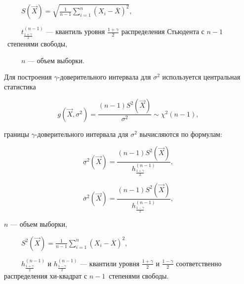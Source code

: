 \noindent~~~~~$S(\vec X) = \sqrt{\frac{1}{n-1} \sum\limits_{i=1}^{n} (X_i -
\overline X)^2}$,

\noindent~~~~~$t_{\frac{1+\gamma}{2}}^{(n-1)}$ --- квантиль уровня $\frac{1+\gamma}{2}$
распределения Стьюдента с \mbox{$n-1$~степенями} свободы,

\noindent~~~~~$n$ --- объем выборки.

Для построения $\gamma$-доверительного интервала для $\sigma^2$ используется
центральная статистика

$$g(\vec X, \sigma^2) = \frac{(n-1)S^2(\vec X)}{\sigma^2} \sim \chi^2(n - 1),$$

 границы $\gamma$-доверительного интервала для $\sigma^2$ вычисляются по
формулам:

$$\underline \sigma^2 (\vec X) = \frac{(n-1)S^2(\vec
X)}{h_{\frac{1+\gamma}{2}}^{(n-1)}},$$

$$\overline \sigma^2 (\vec X) = \frac{(n-1)S^2(\vec
X)}{h_{\frac{1-\gamma}{2}}^{(n-1)}},$$

 $n$ --- объем выборки,

\noindent~~~~~$S^2(\vec X) = \frac{1}{n-1} \sum\limits_{i=1}^{n} (X_i -
\overline X)^2$,

\noindent~~~~~$h_{\frac{1+\gamma}{2}}^{(n-1)}$ и
$h_{\frac{1-\gamma}{2}}^{(n-1)}$ --- квантили уровня $\frac{1+\gamma}{2}$ и
$\frac{1-\gamma}{2}$ соответственно распределения хи-квадрат с
\mbox{$n-1$~степенями} свободы.

